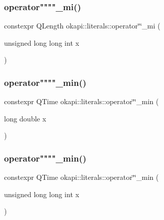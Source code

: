 \mbox{\label{namespaceokapi_1_1literals_a31846758da45d0f07eaf9110e4f1a4d8}} 
\subsubsection{\texorpdfstring{operator""""\_mi()}{operator""\_mi()}\hspace{0.1cm}{\footnotesize\ttfamily [2/2]}}
{\footnotesize\ttfamily constexpr Q\+Length okapi\+::literals\+::operator\char`\"{}\char`\"{}\+\_\+mi (\begin{DoxyParamCaption}\item[{unsigned long long int}]{x }\end{DoxyParamCaption})}

\mbox{\label{namespaceokapi_1_1literals_aa2bda939825ca29b4d2846fe8b768218}} 
\subsubsection{\texorpdfstring{operator""""\_min()}{operator""\_min()}\hspace{0.1cm}{\footnotesize\ttfamily [1/2]}}
{\footnotesize\ttfamily constexpr Q\+Time okapi\+::literals\+::operator\char`\"{}\char`\"{}\+\_\+min (\begin{DoxyParamCaption}\item[{long double}]{x }\end{DoxyParamCaption})}

\mbox{\label{namespaceokapi_1_1literals_ae9718c12341692e929cde7bedcc55e4a}} 
\subsubsection{\texorpdfstring{operator""""\_min()}{operator""\_min()}\hspace{0.1cm}{\footnotesize\ttfamily [2/2]}}
{\footnotesize\ttfamily constexpr Q\+Time okapi\+::literals\+::operator\char`\"{}\char`\"{}\+\_\+min (\begin{DoxyParamCaption}\item[{unsigned long long int}]{x }\end{DoxyParamCaption})}


